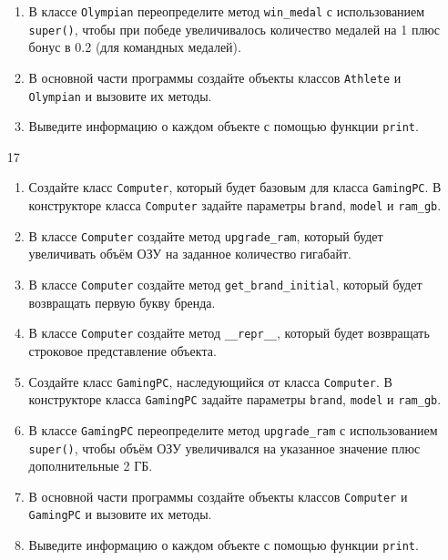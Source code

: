 \begin{enumerate}
\begin{enumerate}
    \item В классе \texttt{Olympian} переопределите метод \texttt{win\_medal} с использованием \texttt{super()}, чтобы при победе увеличивалось количество медалей на 1 плюс бонус в 0.2 (для командных медалей).
    
    \item В основной части программы создайте объекты классов \texttt{Athlete} и \texttt{Olympian} и вызовите их методы.
    
    \item Выведите информацию о каждом объекте с помощью функции \texttt{print}.
\end{enumerate}

\item[17] 
\begin{enumerate}
    \item Создайте класс \texttt{Computer}, который будет базовым для класса \texttt{GamingPC}. В конструкторе класса \texttt{Computer} задайте параметры \texttt{brand}, \texttt{model} и \texttt{ram\_gb}.
    
    \item В классе \texttt{Computer} создайте метод \texttt{upgrade\_ram}, который будет увеличивать объём ОЗУ на заданное количество гигабайт.
    
    \item В классе \texttt{Computer} создайте метод \texttt{get\_brand\_initial}, который будет возвращать первую букву бренда.
    
    \item В классе \texttt{Computer} создайте метод \texttt{\_\_repr\_\_}, который будет возвращать строковое представление объекта.
    
    \item Создайте класс \texttt{GamingPC}, наследующийся от класса \texttt{Computer}. В конструкторе класса \texttt{GamingPC} задайте параметры \texttt{brand}, \texttt{model} и \texttt{ram\_gb}.
    
    \item В классе \texttt{GamingPC} переопределите метод \texttt{upgrade\_ram} с использованием \texttt{super()}, чтобы объём ОЗУ увеличивался на указанное значение плюс дополнительные 2 ГБ.
    
    \item В основной части программы создайте объекты классов \texttt{Computer} и \texttt{GamingPC} и вызовите их методы.
    
    \item Выведите информацию о каждом объекте с помощью функции \texttt{print}.
\end{enumerate}


\end{enumerate}
